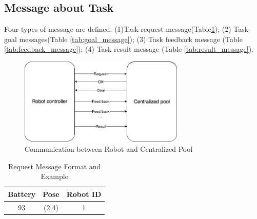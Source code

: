 \subsection{Message about Task}
\label{sec:task_message}
Four types of message are defined: 
(1)Task request message(Table\ref{tab:request_message}); (2) Task goal messages(Table \ref{tab:goal_message}); (3) Task feedback message (Table \ref{tab:feedback_message}); (4) Task result message (Table \ref{tab:result_message}). 

\begin{figure}[htbp]
    \centering
    \includegraphics[width = 0.7\textwidth]{content/images/ch4/robot_pool_comminication.drawio.png}
    \caption{Communication between Robot and Centralized Pool}
    \label{fig:comminication}
\end{figure}

\begin{table}[htb]
\centering
\begin{tabular}{|c|c|c|} 
\hline
Battery & Pose & Robot ID\\
\hline\hline
93	&(2,4)	&1 \\ [1ex] 
\hline
\end{tabular}
\caption{Request Message Format and Example}
\label{tab:request_message}
\end{table}

\begin{table}[htb]
\centering
{}
\caption{Action Goal Message Format and Example}
\label{tab:goal_message}
\end{table}

